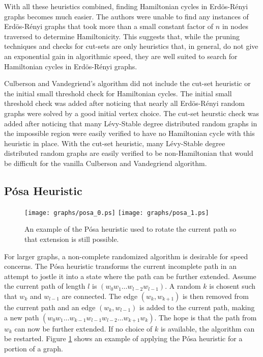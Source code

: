 \documentclass[twoside,11pt]{article}
\begin{document}
With all these heuristics combined, finding Hamiltonian cycles in Erd\"os-R\'enyi graphs becomes much easier.
The authors were unable to find
any instances of Erd\"os-R\'enyi graphs that took more than a small constant factor of $n$ in
nodes traversed to determine Hamiltonicity.  This suggests that, while the pruning techniques and checks for
cut-sets are only heuristics that, in general,
do not give an exponential gain in algorithmic speed, they are well suited to search for Hamiltonian cycles
in Erd\"os-R\'enyi graphs.

Culberson and Vandegriend's algorithm did not include the cut-set heuristic or the initial small threshold check for
Hamiltonian cycles.  The initial small threshold check was added after noticing that nearly all Erd\"os-R\'enyi
random graphs were solved by a good initial vertex choice.  The cut-set heurstic check was added after noticing
that many L\'evy-Stable degree distributed random graphs in the impossible region were easily verified to
have no Hamiltonian cycle with this heuristic in place.  
With the cut-set heuristic, many L\'evy-Stable degree distributed random graphs
are easily verified to be non-Hamiltonian that would be difficult for the vanilla Culberson
and Vandegriend algorithm.



\subsection{P\'osa Heuristic}

\begin{figure}
\centering
\texttt{[image: graphs/posa\_0.ps]}
\texttt{[image: graphs/posa\_1.ps]}
\caption{ An example of the P\'osa heuristic used to rotate the current path so that extension is still
possible. }
\label{fig:posa_example}
\end{figure}


For larger graphs, a non-complete randomized algorithm is desirable for speed concerns.
The P\'osa heuristic transforms the current incomplete path in an attempt to jostle it into
a state where the path can be further extended.  Assume the current path of length $l$ is $ ( w_0 w_1 \dots w_{l-2} w_{l-1} ) $.  
A random $k$ is chosent such that $w_k$ and $w_{l-1}$ are connected.  
The edge $ ( w_{k} , w_{k+1} ) $ is then removed from the current path
and an edge $ ( w_k , w_{l-1} ) $ is added to the current path, making a new path $ ( w_0 w_1 \dots w_{k-1} w_{l-1} w_{l-2} \dots w_{k+1} w_k ) $.
The hope is that the path from $w_k$ can now be further extended.
If no choice of $k$ is available, the algorithm can be restarted.  Figure \ref{fig:posa_example} shows an example of applying
the P\'osa heuristic for a portion of a graph.
\end{document}
